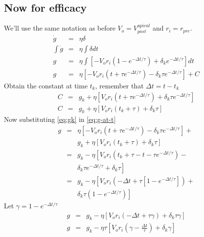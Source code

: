 \subsection{Now for efficacy}
We'll use the same notation as before $V_{o} = V^{apical}_{post}$ and $r_{i} = r_{pre}$.
\begin{eqnarray}
	\dot{g} &=& \eta \delta \\
	\int\dot{g} &=& \eta \int\delta dt\\	
	g &=& \eta \int \left[ -V_{o} r_{i} \left(1 - e^{-\Delta t/\tau}\right)  + \delta_k e^{-\Delta t/\tau} \right]dt \\
	g &=& \eta \left[ -V_{o} r_{i} \left(t + \tau e^{-\Delta t/\tau}\right)  - \delta_k \tau e^{-\Delta t/\tau} \right] + C
	\label{eq:g-at-t}
\end{eqnarray}
Obtain the constant at time $t_k$, remember that $\Delta t = t - t_k$
\begin{eqnarray}
	C &=& g_{k} + \eta \left[ V_{o} r_{i} \left(t + \tau e^{-\Delta t/\tau}\right) + \delta_k \tau e^{-\Delta t/\tau} \right]\\
	C &=& g_{k} + \eta \left[ V_{o} r_{i} \left(t_{k} + \tau\right) + \delta_k \tau \right]
	\label{eq:gk}
\end{eqnarray}
Now substituting \ref{eq:gk} in \ref{eq:g-at-t}
\begin{eqnarray}
	g &=& \eta \left[ -V_{o} r_{i} \left(t + \tau e^{-\Delta t/\tau}\right)  - \delta_k \tau e^{-\Delta t/\tau} \right] +  \nonumber\\
	& & g_{k} + \eta \left[ V_{o} r_{i} \left(t_{k} + \tau\right) + \delta_k \tau \right]\\
	&=& g_{k} -\eta \left[V_{o} r_{i} \left(t_{k} + \tau - t - \tau e^{-\Delta t/\tau}\right)  -  \right. \nonumber\\
    & & \left. \delta_k \tau e^{-\Delta t/\tau} + \delta_k \tau\right] \\
	&=& g_{k} -\eta \left[V_{o} r_{i} \left(-\Delta t + \tau\left[1 - e^{-\Delta t/\tau}\right]\right)  +  \right. \nonumber\\
    & & \left. \delta_k \tau\left(1 - e^{-\Delta t/\tau} \right)\right]
\end{eqnarray}
Let $\gamma = 1 - e^{-\Delta t/\tau}$
\begin{eqnarray}
	g &=& g_{k} -\eta \left[V_{o} r_{i} \left(-\Delta t + \tau\gamma\right)  + 
          \delta_k \tau \gamma \right] \\
g &=& g_{k} -\eta \tau \left[V_{o} r_{i} \left(\gamma -\frac{\Delta t}{\tau} \right)  + 
\delta_k \gamma \right] 
\end{eqnarray}


